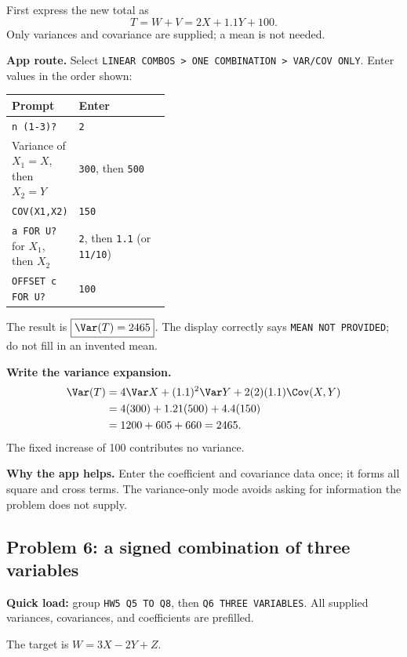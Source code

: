 First express the new total as
\[
T=W+V=2X+1.1Y+100.
\]
Only variances and covariance are supplied; a mean is not needed.

\textbf{App route.} Select \texttt{LINEAR COMBOS > ONE COMBINATION > VAR/COV ONLY}. Enter values in the order shown:
\begin{center}
\begin{tabularx}{\linewidth}{@{}p{0.40\linewidth}X@{}}
\toprule Prompt & Enter\\\midrule
\texttt{n (1-3)?} & \texttt{2}\\
Variance of $X_1=X$, then $X_2=Y$ & \texttt{300}, then \texttt{500}\\
\texttt{COV(X1,X2)} & \texttt{150}\\
\texttt{a FOR U?} for $X_1$, then $X_2$ & \texttt{2}, then \texttt{1.1} (or \texttt{11/10})\\
\texttt{OFFSET c FOR U?} & \texttt{100}\\\bottomrule
\end{tabularx}
\end{center}
The result is $\boxed{\Var(T)=2465}$. The display correctly says \texttt{MEAN NOT PROVIDED}; do not fill in an invented mean.

\textbf{Write the variance expansion.}
\[
\begin{aligned}
\Var(T)&=4\Var X+(1.1)^2\Var Y+2(2)(1.1)\Cov(X,Y)\\
&=4(300)+1.21(500)+4.4(150)\\
&=1200+605+660=2465.
\end{aligned}
\]
The fixed increase of 100 contributes no variance.

\textbf{Why the app helps.} Enter the coefficient and covariance data once; it forms all square and cross terms. The variance-only mode avoids asking for information the problem does not supply.

\subsection{Problem 6: a signed combination of three variables}
\textbf{Quick load:} group \texttt{HW5 Q5 TO Q8}, then \texttt{Q6 THREE VARIABLES}. All supplied variances, covariances, and coefficients are prefilled.

The target is $W=3X-2Y+Z$.

